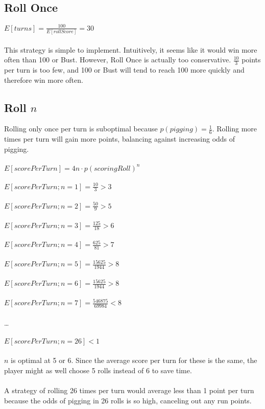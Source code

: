 \documentclass{article}
\begin{document}
\subsection*{Roll Once}
$E[turns] = \frac{100}{E[rollScore]} = 30$
\\\\
This strategy is simple to implement. Intuitively, it seems like it would win more often than 100 or Bust. However, Roll Once is actually too conservative. $\frac{10}{3}$ points per turn is too few, and 100 or Bust will tend to reach 100 more quickly and therefore win more often.
\subsection*{Roll $n$}
Rolling only once per turn is suboptimal because $p(pigging) = \frac{1}{6}$. Rolling more times per turn will gain more points, balancing against increasing odds of pigging.
\\\\
$E[scorePerTurn] = 4n \cdot p(scoringRoll)^n$
\\\\
$E[scorePerTurn; n = 1] = \frac{10}{3} > 3$
\\\\
$E[scorePerTurn; n = 2] = \frac{50}{9} > 5$
\\\\
$E[scorePerTurn; n = 3] = \frac{125}{18} > 6$
\\\\
$E[scorePerTurn; n = 4] = \frac{625}{81} > 7$
\\\\
$E[scorePerTurn; n = 5] = \frac{15625}{1944} > 8$
\\\\
$E[scorePerTurn; n = 6] = \frac{15625}{1944} > 8$
\\\\
$E[scorePerTurn; n = 7] = \frac{546875}{69984} < 8$
\\\\
\ldots
\\\\
$E[scorePerTurn; n = 26] < 1$
\\\\
$n$ is optimal at 5 or 6. Since the average score per turn for these is the same, the player might as well choose 5 rolls instead of 6 to save time.
\\\\
A strategy of rolling 26 times per turn would average less than 1 point per turn because the odds of pigging in 26 rolls is so high, canceling out any run points.
\\\\
\end{document}
